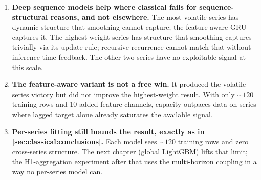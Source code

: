 \begin{enumerate}
  \item \textbf{Deep sequence models help where classical fails for sequence-structural reasons, and not elsewhere.} The most-volatile series has dynamic structure that smoothing cannot capture; the feature-aware GRU captures it. The highest-weight series has structure that smoothing captures trivially via its update rule; recursive recurrence cannot match that without inference-time feedback. The other two series have no exploitable signal at this scale.
  \item \textbf{The feature-aware variant is not a free win.} It produced the volatile-series victory but did not improve the highest-weight result. With only ${\sim}120$ training rows and 10 added feature channels, capacity outpaces data on series where lagged target alone already saturates the available signal.
  \item \textbf{Per-series fitting still bounds the result, exactly as in \cref{sec:classical:conclusions}.} Each model sees ${\sim}120$ training rows and zero cross-series structure. The next chapter (global LightGBM) lifts that limit; the H1-aggregation experiment after that uses the multi-horizon coupling in a way no per-series model can.
\end{enumerate}
